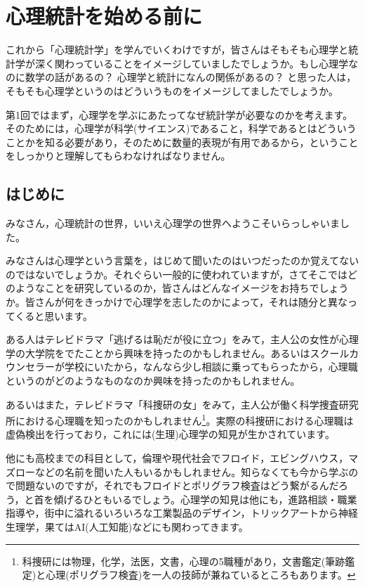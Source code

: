 \documentclass{ltjsbook}
\begin{document}
\chapter{心理統計を始める前に}
\label{m01_introduction}
これから「心理統計学」を学んでいくわけですが，皆さんはそもそも心理学と統計学が深く関わっていることをイメージしていましたでしょうか。もし心理学なのに数学の話があるの？ 心理学と統計になんの関係があるの？ と思った人は，そもそも心理学というのはどういうものをイメージしてましたでしょうか。

第1回ではまず，心理学を学ぶにあたってなぜ統計学が必要なのかを考えます。そのためには，心理学が科学(サイエンス)であること，科学であるとはどういうことかを知る必要があり，そのために数量的表現が有用であるから，ということをしっかりと理解してもらわなければなりません。

\section{はじめに}

みなさん，心理統計の世界，いいえ心理学の世界へようこそいらっしゃいました。

みなさんは心理学という言葉を，はじめて聞いたのはいつだったのか覚えてないのではないでしょうか。それぐらい一般的に使われていますが，さてそこではどのようなことを研究しているのか，皆さんはどんなイメージをお持ちでしょうか。皆さんが何をきっかけで心理学を志したのかによって，それは随分と異なってくると思います。

ある人はテレビドラマ「逃げるは恥だが役に立つ」をみて，主人公の女性が心理学の大学院をでたことから興味を持ったのかもしれません。あるいはスクールカウンセラーが学校にいたから，なんなら少し相談に乗ってもらったから，心理職というのがどのようなものなのか興味を持ったのかもしれません。

あるいはまた，テレビドラマ「科捜研の女」をみて，主人公が働く科学捜査研究所における心理職を知ったのかもしれません\footnote{科捜研には物理，化学，法医，文書，心理の5職種があり，文書鑑定(筆跡鑑定)と心理(ポリグラフ検査)を一人の技師が兼ねているところもあります。}。実際の科捜研における心理職は虚偽検出を行っており，これには(生理)心理学の知見が生かされています。

他にも高校までの科目として，倫理や現代社会でフロイド，エビングハウス，マズローなどの名前を聞いた人もいるかもしれません。知らなくても今から学ぶので問題ないのですが，それでもフロイドとポリグラフ検査はどう繋がるんだろう，と首を傾げるひともいるでしょう。心理学の知見は他にも，進路相談・職業指導や，街中に溢れるいろいろな工業製品のデザイン，トリックアートから神経生理学，果てはAI(人工知能)などにも関わってきます。
\end{document}
